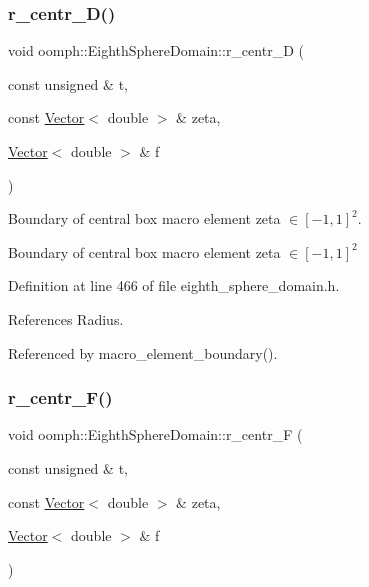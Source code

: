 \subsubsection{\texorpdfstring{r\+\_\+centr\+\_\+\+D()}{r\_centr\_D()}}
{\footnotesize\ttfamily void oomph\+::\+Eighth\+Sphere\+Domain\+::r\+\_\+centr\+\_\+D (\begin{DoxyParamCaption}\item[{const unsigned \&}]{t,  }\item[{const \hyperlink{classoomph_1_1Vector}{Vector}$<$ double $>$ \&}]{zeta,  }\item[{\hyperlink{classoomph_1_1Vector}{Vector}$<$ double $>$ \&}]{f }\end{DoxyParamCaption})\hspace{0.3cm}{\ttfamily [private]}}



Boundary of central box macro element zeta $ \in [-1,1]^2 $. 

Boundary of central box macro element zeta $ \in [-1,1]^2 $ 

Definition at line 466 of file eighth\+\_\+sphere\+\_\+domain.\+h.



References Radius.



Referenced by macro\+\_\+element\+\_\+boundary().

\mbox{\label{classoomph_1_1EighthSphereDomain_a080334e0a4e7cd61c97f0b2bf1174f00}} 
\subsubsection{\texorpdfstring{r\+\_\+centr\+\_\+\+F()}{r\_centr\_F()}}
{\footnotesize\ttfamily void oomph\+::\+Eighth\+Sphere\+Domain\+::r\+\_\+centr\+\_\+F (\begin{DoxyParamCaption}\item[{const unsigned \&}]{t,  }\item[{const \hyperlink{classoomph_1_1Vector}{Vector}$<$ double $>$ \&}]{zeta,  }\item[{\hyperlink{classoomph_1_1Vector}{Vector}$<$ double $>$ \&}]{f }\end{DoxyParamCaption})\hspace{0.3cm}{\ttfamily [private]}}



